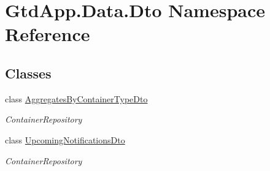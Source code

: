 \hypertarget{namespace_gtd_app_1_1_data_1_1_dto}{}\section{Gtd\+App.\+Data.\+Dto Namespace Reference}
\label{namespace_gtd_app_1_1_data_1_1_dto}
\subsection*{Classes}
\begin{DoxyCompactItemize}
\item 
class \mbox{\hyperlink{class_gtd_app_1_1_data_1_1_dto_1_1_aggregates_by_container_type_dto}{Aggregates\+By\+Container\+Type\+Dto}}
\begin{DoxyCompactList}\small\item\em Container\+Repository \end{DoxyCompactList}\item 
class \mbox{\hyperlink{class_gtd_app_1_1_data_1_1_dto_1_1_upcoming_notifications_dto}{Upcoming\+Notifications\+Dto}}
\begin{DoxyCompactList}\small\item\em Container\+Repository \end{DoxyCompactList}\end{DoxyCompactItemize}
